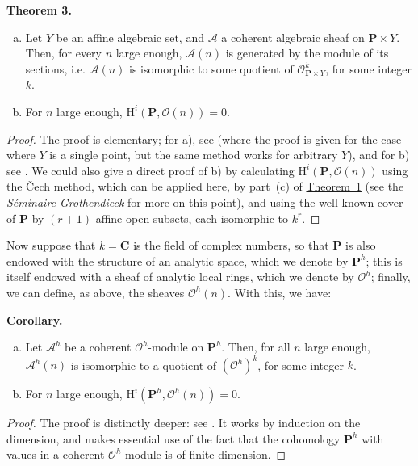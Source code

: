 \documentclass{article}
\newenvironment{itenv}[1]
  {\smallskip\noindent\textbf{#1.}\itshape}
  {\smallskip}
\newcommand{\scr}[1]{{\mathscr{#1}}}
\newcommand{\HH}{\mathrm{H}}
\newcommand{\oldpage}[1]{\marginpar{\footnotesize$\Big\vert$ \textit{p.~#1}}}
\begin{document}
\begin{itenv}{Theorem 3}
\label{theorem3}
\begin{enumerate}[(a)]
  \item Let $Y$ be an affine algebraic set, and $\scr{A}$ a coherent algebraic sheaf on $\mathbf{P}\times Y$.
    Then, for every $n$ large enough, $\scr{A}(n)$ is generated by the module of its sections, i.e. $\scr{A}(n)$ is isomorphic to some quotient of $\scr{O}_{\mathbf{P}\times Y}^k$, for some integer $k$.
  \item For $n$ large enough, $\HH^i(\mathbf{P},\scr{O}(n))=0$.
\end{enumerate}
\end{itenv}

\begin{proof}
  The proof is elementary; for a), see \cite[page~247, th\'{e}or\`{e}me~1]{1} (where the proof is given for the case where $Y$ is a single point, but the same method works for arbitrary $Y$), and for b) see \cite[page~259, th\'{e}or\`{e}me~2]{1}.
  We could also give a direct proof of b) by calculating $\HH^i(\mathbf{P},\scr{O}(n))$ using the \v{C}ech method, which can be applied here, by part~(c) of \hyperref[theorem1]{Theorem~1} (see the \emph{S\'{e}minaire Grothendieck} for more on this point), and using the well-known cover of $\mathbf{P}$ by $(r+1)$ affine open subsets, each isomorphic to $k^r$.
\end{proof}

Now suppose that $k=\mathbf{C}$ is the field of complex numbers, so that $\mathbf{P}$ is also endowed with the structure of an analytic space, which we denote by $\mathbf{P}^h$;
this is itself endowed with a sheaf of analytic local rings, which we denote by $\scr{O}^h$;
finally, we can define, as above, the sheaves $\scr{O}^h(n)$.
With this, we have:

\begin{itenv}{Corollary}
\label{corollary-3}
  \oldpage{2-07}
  \begin{enumerate}[(a)]
    \item Let $\scr{A}^h$ be a coherent $\scr{O}^h$-module on $\mathbf{P}^h$.
      Then, for all $n$ large enough, $\scr{A}^h(n)$ is isomorphic to a quotient of $(\scr{O}^h)^k$, for some integer $k$.
    \item For $n$ large enough, $\HH^i(\mathbf{P}^h,\scr{O}^h(n))=0$.
  \end{enumerate}
\end{itenv}

\begin{proof}
  The proof is distinctly deeper: see \cite[lemme~5, page~12, and lemma~8, page~24]{2}.
  It works by induction on the dimension, and makes essential use of the fact that the cohomology $\mathbf{P}^h$ with values in a coherent $\scr{O}^h$-module is of finite dimension.
\end{proof}
\end{document}
